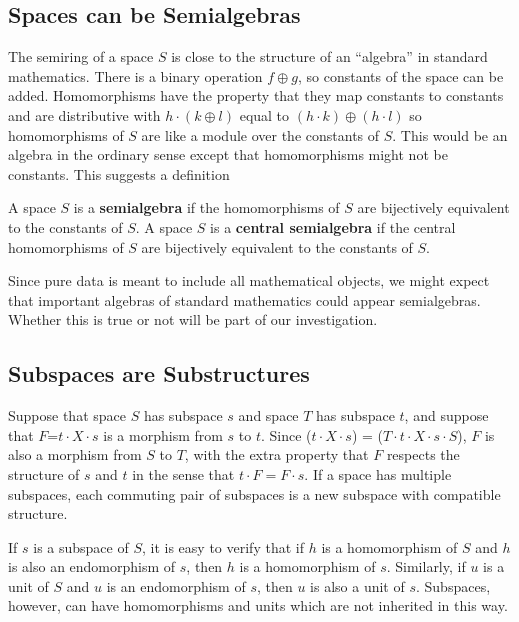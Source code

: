 \documentclass[11pt]{article}
\begin{document}
\subsection{Spaces can be Semialgebras} 

The semiring of a space $S$ is close to the structure of an ``algebra'' in standard mathematics.  There is a binary operation $f\oplus g$, so 
constants of the space can be added.  Homomorphisms have the property that they map constants to constants and are distributive with 
$h\cdot (k\oplus l)$ equal to $(h\cdot k)\oplus (h\cdot l)$ so homomorphisms of $S$ are like a module over the constants of $S$.  This would 
be an algebra in the ordinary sense except that homomorphisms might not be constants.  This suggests a definition 

\begin{definition}
A space $S$ is a {\bf semialgebra} if the homomorphisms of $S$ are bijectively equivalent to the constants of $S$.
A space $S$ is a {\bf central semialgebra} if the central homomorphisms of $S$ are bijectively equivalent to the constants of $S$.
\end{definition}
\noindent Since pure data is meant to include all mathematical objects, we might expect that important algebras of standard 
mathematics could appear semialgebras.  Whether this is true or not will be part of our investigation. 

\subsection{Subspaces are Substructures} 

Suppose that space $S$ has subspace $s$ and space $T$ has subspace $t$, and suppose that $F$=$t\cdot X\cdot s$ is a morphism from $s$ to $t$.   
Since ($t\cdot X\cdot s$) = ($T\cdot t \cdot X\cdot s\cdot S$), 
$F$ is also a morphism from $S$ to $T$, with the extra property that $F$ respects the structure of $s$ and $t$ in the sense that $t\cdot F=F\cdot s$.  
If a space has multiple subspaces, each commuting pair of subspaces is a new subspace with compatible structure.  

     If $s$ is a subspace of $S$, it is easy to verify that if $h$ is a homomorphism of $S$ and $h$ is also an endomorphism of $s$, then $h$ is 
a homomorphism of $s$.  Similarly, if $u$ is a unit of $S$ and $u$ is an endomorphism of $s$, then $u$ is also a unit of $s$.  Subspaces, however, 
can have homomorphisms and units which are not inherited in this way.
\end{document}
